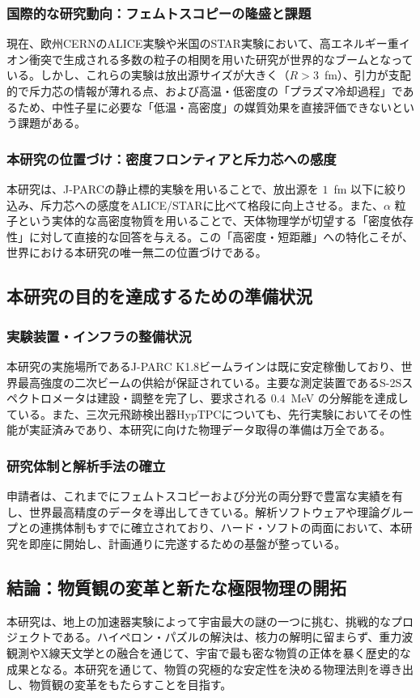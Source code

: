 \documentclass[11pt,a4j,dvipdfmx]{jarticle} 					%
\newcommand{\研究課題名}{加速器実験による短距離バリオン間相互作用の解明と中性子星ハイペロンパズルの解決}
\newcommand{\研究機関名}{東北大学}
\newcommand{\研究代表者氏名}{市川裕大}
\newcommand{\研究期間の最終元号年度}{13}  %
\begin{document}
\subsubsection{国際的な研究動向：フェムトスコピーの隆盛と課題}
現在、欧州CERNのALICE実験や米国のSTAR実験において、高エネルギー重イオン衝突で生成される多数の粒子の相関を用いた研究が世界的なブームとなっている。しかし、これらの実験は放出源サイズが大きく（$R > 3$~fm）、引力が支配的で斥力芯の情報が薄れる点、および高温・低密度の「プラズマ冷却過程」であるため、中性子星に必要な「低温・高密度」の媒質効果を直接評価できないという課題がある。

\subsubsection{本研究の位置づけ：密度フロンティアと斥力芯への感度}
本研究は、J-PARCの静止標的実験を用いることで、放出源を $1$~fm 以下に絞り込み、斥力芯への感度をALICE/STARに比べて格段に向上させる。また、$\alpha$ 粒子という実体的な高密度物質を用いることで、天体物理学が切望する「密度依存性」に対して直接的な回答を与える。この「高密度・短距離」への特化こそが、世界における本研究の唯一無二の位置づけである。

\subsection{本研究の目的を達成するための準備状況}
\subsubsection{実験装置・インフラの整備状況}
本研究の実施場所であるJ-PARC K1.8ビームラインは既に安定稼働しており、世界最高強度の二次ビームの供給が保証されている。主要な測定装置であるS-2Sスペクトロメータは建設・調整を完了し、要求される $0.4$~MeV の分解能を達成している。また、三次元飛跡検出器HypTPCについても、先行実験においてその性能が実証済みであり、本研究に向けた物理データ取得の準備は万全である。

\subsubsection{研究体制と解析手法の確立}
申請者は、これまでにフェムトスコピーおよび分光の両分野で豊富な実績を有し、世界最高精度のデータを導出してきている。解析ソフトウェアや理論グループとの連携体制もすでに確立されており、ハード・ソフトの両面において、本研究を即座に開始し、計画通りに完遂するための基盤が整っている。

\subsection{結論：物質観の変革と新たな極限物理の開拓}
本研究は、地上の加速器実験によって宇宙最大の謎の一つに挑む、挑戦的なプロジェクトである。ハイペロン・パズルの解決は、核力の解明に留まらず、重力波観測やX線天文学との融合を通じて、宇宙で最も密な物質の正体を暴く歴史的な成果となる。本研究を通じて、物質の究極的な安定性を決める物理法則を導き出し、物質観の変革をもたらすことを目指す。
\end{document}
